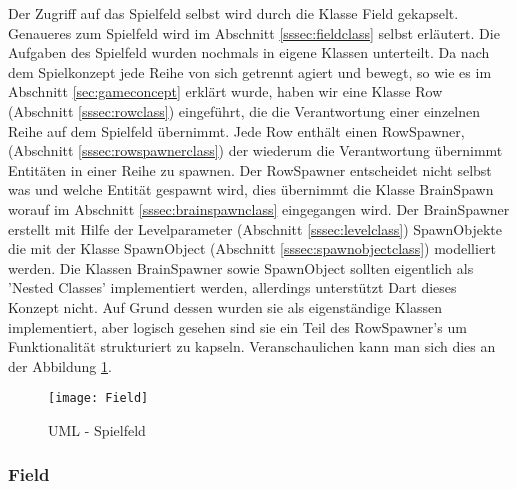 \documentclass[a4paper,10pt]{report}
\begin{document}
{{			Der Zugriff auf das Spielfeld selbst wird durch die Klasse Field gekapselt.
			Genaueres zum Spielfeld wird im Abschnitt \ref{sssec:fieldclass} selbst erläutert.
			Die Aufgaben des Spielfeld wurden nochmals in eigene Klassen unterteilt.
			\newline \newline
			Da nach dem Spielkonzept jede Reihe von sich getrennt agiert und bewegt, so wie es im Abschnitt \ref{sec:gameconcept} erklärt wurde,
			haben wir eine Klasse Row (Abschnitt \ref{sssec:rowclass}) eingeführt, die die Verantwortung einer einzelnen Reihe auf dem Spielfeld übernimmt.
			\newline \newline
			Jede Row enthält einen RowSpawner, (Abschnitt \ref{sssec:rowspawnerclass}) der wiederum die Verantwortung übernimmt Entitäten in einer Reihe zu spawnen.
			\newline \newline  
			Der RowSpawner entscheidet nicht selbst was und welche Entität gespawnt wird, dies übernimmt die Klasse BrainSpawn worauf im Abschnitt \ref{sssec:brainspawnclass} eingegangen wird.
			\newline \newline
			Der BrainSpawner erstellt mit Hilfe der Levelparameter (Abschnitt \ref{sssec:levelclass}) SpawnObjekte die mit der Klasse SpawnObject (Abschnitt \ref{sssec:spawnobjectclass}) modelliert werden.			
			\newline \newline
			Die Klassen BrainSpawner sowie SpawnObject sollten eigentlich als 'Nested Classes' implementiert werden, allerdings unterstützt Dart dieses Konzept nicht. Auf Grund dessen wurden sie als eigenständige Klassen
			implementiert, aber logisch gesehen sind sie ein Teil des RowSpawner's um Funktionalität strukturiert zu kapseln.
			\newline \newline
			Veranschaulichen kann man sich dies an der Abbildung \ref{fig:umlfield}.
						
			\begin{figure}			
				\texttt{[image: Field]}
				\caption{UML - Spielfeld}
				\label{fig:umlfield}
			\end{figure}				
			
								
			\subsubsection{Field}
			{
				\label{sssec:fieldclass}
				
}}}
\end{document}
